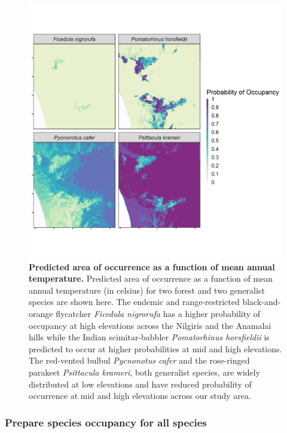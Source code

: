 \documentclass[
]{article}
\begin{document}
\begin{figure}
\centering
\includegraphics{figs/fig_06.png}
\caption{\textbf{Predicted area of occurrence as a function of mean annual temperature.}
Predicted area of occurrence as a function of mean annual temperature (in celsius) for two forest and two generalist species are shown here. The endemic and range-restricted black-and-orange flycatcher \emph{Ficedula nigrorufa} has a higher probability of occupancy at high elevations across the Nilgiris and the Anamalai hills while the Indian scimitar-babbler \emph{Pomatorhinus horsfieldii} is predicted to occur at higher probabilities at mid and high elevations. The red-vented bulbul \emph{Pycnonotus cafer} and the rose-ringed parakeet \emph{Psittacula krameri}, both generalist species, are widely distributed at low elevations and have reduced probability of occurrence at mid and high elevations across our study area.}
\end{figure}

\hypertarget{prepare-species-occupancy-for-all-species}{%
\subsubsection{Prepare species occupancy for all species}\label{prepare-species-occupancy-for-all-species}}
\end{document}
